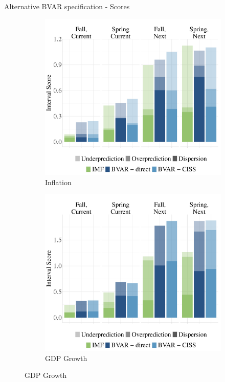 \documentclass[en]{sdqbeamer}
\begin{document}
\begin{frame}{Alternative BVAR specification - Scores}
\label{alternativebvar}
\begin{figure}
  \begin{subfigure}{0.45\textwidth}
  \centering
    \includegraphics[width=\textwidth]{figures/bvarspecs_wis_pcpi_pch_ho.pdf} %
    \caption{Inflation}
  \end{subfigure}
  \hspace*{8mm}
  \begin{subfigure}{0.45\textwidth}
  \centering
    \includegraphics[width=\textwidth]{figures/bvarspecs_wis_ngdp_rpch_ho.pdf} %
    \caption{GDP Growth}
  \end{subfigure}%
\end{figure}
\end{frame}
\end{document}
